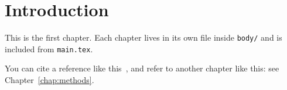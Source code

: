 \chapter{Introduction}
\label{chap:introduction}

This is the first chapter. Each chapter lives in its own file inside \texttt{body/}
and is included from \texttt{main.tex}.

You can cite a reference like this~\cite{knuth1984}, and refer to another
chapter like this: see Chapter~\ref{chap:methods}.
